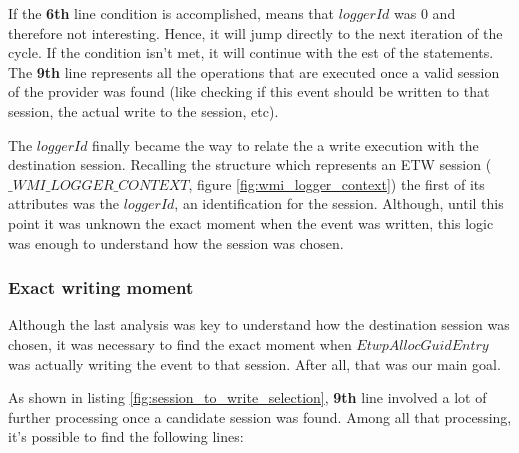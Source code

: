 If the {\bfseries 6th} line condition is accomplished, means that $loggerId$ was 0 and therefore not interesting. Hence, it will jump directly to the next iteration of the cycle. If the condition isn't met, it will continue with the est of the statements.\\
The {\bfseries 9th} line represents all the operations that are executed once a valid session of the provider was found (like checking if this event should be written to that session, the actual write to the session, etc). 


The $loggerId$ finally became the way to relate the a write execution with the destination session. Recalling the structure which represents an ETW session ($\_WMI\_LOGGER\_CONTEXT$, figure \ref{fig:wmi_logger_context}) the first of its attributes was the $loggerId$, an identification for the session. Although, until this point it was unknown the exact moment when the event was written, this logic was enough to understand how the session was chosen. 



\subsubsection{\bfseries Exact writing moment}
Although the last analysis was key to understand how the destination session was chosen, it was necessary to find the exact moment when $EtwpAllocGuidEntry$ was actually writing the event to that session. After all, that was our main goal. 


As shown in listing \ref{fig:session_to_write_selection}, {\bfseries 9th} line involved a lot of further processing once a candidate session was found. Among all that processing, it's possible to find the following lines: 

